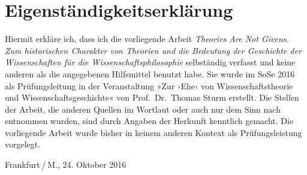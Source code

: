\endgroup
\newpage

\section*{Eigenständigkeitserklärung}\label{eigenstuxe4ndigkeitserkluxe4rung}

Hiermit erkläre ich, dass ich die vorliegende Arbeit \emph{Theories Are
Not Givens. Zum historischen Charakter von Theorien und die Bedeutung
der Geschichte der Wissenschaften für die Wissenschaftsphilosophie}
selbständig verfasst und keine anderen als die angegebenen Hilfsmittel
benutzt habe. Sie wurde im SoSe 2016 als Prüfungsleitung in der
Veranstaltung »Zur ›Ehe‹ von Wissenschaftstheorie und
Wissenschaftsgeschichte« von Prof.~Dr.~Thomas Sturm erstellt. Die
Stellen der Arbeit, die anderen Quellen im Wortlaut oder auch nur dem
Sinn nach entnommen wurden, sind durch Angaben der Herkunft kenntlich
gemacht. Die vorliegende Arbeit wurde bisher in keinem anderen Kontext
als Prüfungsleistung vorgelegt. \vspace{3em}

\noindent Frankfurt / M., 24. Oktober 2016
